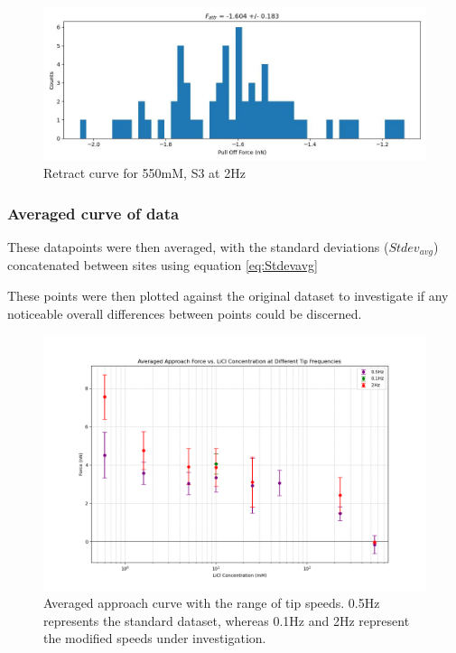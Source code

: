 \begin{figure}[h!]
\centering
\includegraphics[width=\textwidth]{chapter7/Tip speed/550mM/S3 2Hz/retract_f_a_hist.jpg}
\caption{Retract curve for 550mM, S3 at 2Hz}
\end{figure}
\newpage

\subsubsection{Averaged curve of data}
These datapoints were then averaged, with the standard deviations ($Stdev_{avg}$) concatenated between sites using equation \ref{eq:Stdevavg}

These points were then plotted against the original dataset to investigate if any noticeable overall differences between points could be discerned.

\begin{figure}[h!]
\centering
\includegraphics[width=\textwidth]{chapter7/Tip speed/Overall graph approach.png}
\caption{Averaged approach curve with the range of tip speeds. 0.5Hz represents the standard dataset, whereas 0.1Hz and 2Hz represent the modified speeds under investigation.}
\label{fig:ApproachAverageSpeed}
\end{figure}


